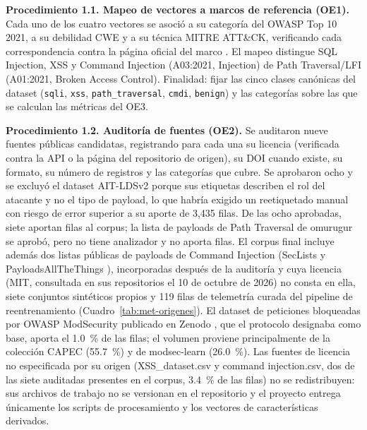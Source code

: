 \textbf{Procedimiento 1.1. Mapeo de vectores a marcos de referencia (OE1).} Cada uno de los
cuatro vectores se asoció a su categoría del OWASP Top 10 2021, a su debilidad CWE y a su
técnica MITRE ATT\&CK, verificando cada correspondencia contra la página oficial del marco
\cite{owasp2021, owaspa01_2021, owaspa03_2021, mitret1190, mitret1189}. El mapeo distingue
SQL Injection, XSS y Command Injection (A03:2021, Injection) de Path Traversal/LFI (A01:2021,
Broken Access Control). Finalidad: fijar las cinco clases canónicas del dataset (\texttt{sqli},
\texttt{xss}, \texttt{path\_traversal}, \texttt{cmdi}, \texttt{benign}) y las categorías sobre
las que se calculan las métricas del OE3.

\textbf{Procedimiento 1.2. Auditoría de fuentes (OE2).} Se auditaron nueve fuentes públicas
candidatas, registrando para cada una su licencia (verificada contra la API o la página del
repositorio de origen), su DOI cuando existe, su formato, su número de registros y las
categorías que cubre. Se aprobaron ocho y se excluyó el dataset AIT-LDSv2 \cite{landauer2022ait,landauer2023maintainable} porque sus etiquetas
describen el rol del atacante y no el tipo de payload, lo que habría exigido un reetiquetado manual
con riesgo de error superior a su aporte de 3{,}435 filas. De las ocho aprobadas, siete aportan
filas al corpus; la lista de payloads de Path Traversal de omurugur \cite{ugur2019traversal} se aprobó, pero no tiene
analizador y no aporta filas. El corpus final incluye además dos listas públicas de payloads de Command Injection (SecLists y PayloadsAllTheThings
\cite{miessler2026seclists,swisskyrepo2026payloads}), incorporadas después de la auditoría y cuya
licencia (MIT, consultada en sus repositorios el 10 de octubre de 2026) no consta en ella, siete
conjuntos sintéticos propios y 119 filas de telemetría curada del pipeline de reentrenamiento
(Cuadro~\ref{tab:met-origenes}). El dataset de peticiones bloqueadas por OWASP ModSecurity
publicado en Zenodo \cite{lucz2025,lucz2025data}, que el protocolo designaba como base, aporta el 1.0~\% de las
filas; el volumen proviene principalmente de la colección CAPEC
\cite{sureda2022srbh,sureda2022newmultilabel} (55.7~\%) y de modsec-learn
\cite{pralab2024modseclearn,scano2024modseclearn} (26.0~\%). Las fuentes de licencia no especificada por su origen (XSS\_dataset.csv y command
injection.csv, dos de las siete auditadas presentes en el corpus, 3.4~\% de las filas) no se
redistribuyen: sus archivos de trabajo no se versionan en el repositorio y el proyecto entrega
únicamente los scripts de procesamiento y los vectores de características derivados.

